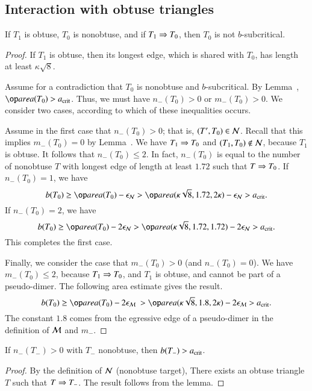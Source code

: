 \subsection{Interaction with obtuse triangles}

\begin{lemma}
  If $T_1$ is obtuse, $T_0$ is nonobtuse, and if $T_1 \Rightarrow T_0$, then
  $T_0$ is not $b$-subcritical.
\end{lemma}


\begin{proof} 
  If $T_1$ is obtuse, then its longest edge, which is shared with
  $T_0$, has length at least $\kappa\sqrt8$.

  Assume for a contradiction that $T_0$ is nonobtuse and
  $b$-subcritical.  By Lemma~, $\area(T_0) > \acrit$.
  Thus, we must have $n_-(T_0)>0$ or $m_-(T_0)>0$.  We consider two
  cases, according to which of these inequalities occurs.

  Assume in the first case that $n_-(T_0)>0$; that is, $(T',T_0)\in
  \mathcal N$.  Recall that this implies $m_-(T_0)=0$ by
  Lemma~.  We have $T_1\Rightarrow T_0$ and $(T_1,T_0)\not\in
  \mathcal N$, because $T_1$ is obtuse.  It follows that $n_-(T_0)\le 2$.  In
  fact, $n_-(T_0)$ is equal to the number of nonobtuse $T$ with
  longest edge of length at least $1.72$ such that $T\Rightarrow T_0$.  If
  $n_-(T_0)=1$, we have
  \[
b(T_0) \ge \area(T_0) - \epsN 
> \area(\kappa\sqrt8,1.72,2\kappa)  - \epsN > \acrit.
\]
If $n_-(T_0)=2$, we have
  \[
b(T_0) \ge \area(T_0) - 2\epsN 
> \area(\kappa\sqrt8,1.72,1.72)  - 2\epsN > \acrit.
\]
  This completes the first case.

  Finally, we consider the case that $m_-(T_0)>0$ (and $n_-(T_0)=0$).
  We have $m_-(T_0)\le 2$, because $T_1\Rightarrow T_0$, and $T_1$ is obtuse,
  and cannot be part of a pseudo-dimer.  The following area estimate
  gives the result.
\[
  b(T_0) \ge \area(T_0) - 2\epsM\ 
  > \area(\kappa\sqrt8,1.8,2\kappa) -
  2\epsM > \acrit.
\]
The constant $1.8$ comes from the egressive edge of a pseudo-dimer in
the definition of $\mathcal M$ and $m_-$.
\end{proof}


\begin{corollary} 
  If $n_-(T_-)>0$ with $T_-$ nonobtuse, then $b(T_-) > a_\text{crit}$.
\end{corollary}  

\begin{proof}  
  By the definition of $\mathcal N$ (nonobtuse target), There exists an obtuse
  triangle $T$ such that $T\Rightarrow T_-$.  The result follows from the
  lemma.
\end{proof}

